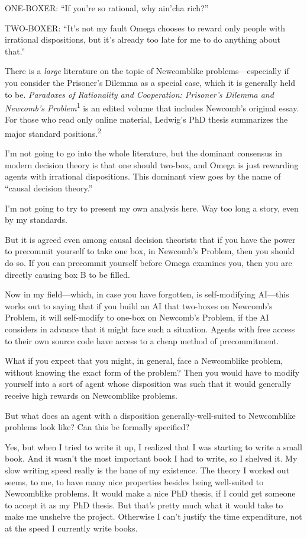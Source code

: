 {
 ONE-BOXER: ``If you're so
rational, why ain'cha rich?''}

{
 TWO-BOXER: ``It's not my fault
Omega chooses to reward only people with irrational dispositions, but
it's already too late for me to do anything about
that.''}

{
 There is a \textit{large} literature on the topic of Newcomblike
problems---especially if you consider the Prisoner's
Dilemma as a special case, which it is generally held to be.
\textit{Paradoxes of Rationality and Cooperation:
Prisoner's Dilemma and Newcomb's
Problem}\textsuperscript{1} is an edited volume that includes
Newcomb's original essay. For those who read only
online material, Ledwig's PhD thesis summarizes the
major standard positions.\textsuperscript{2}}

{
 I'm not going to go into the whole literature, but
the dominant consensus in modern decision theory is that one should
two-box, and Omega is just rewarding agents with irrational
dispositions. This dominant view goes by the name of
``causal decision theory.''}

{
 I'm not going to try to present my own analysis
here. Way too long a story, even by my standards.}

{
 But it is agreed even among causal decision theorists that if you
have the power to precommit yourself to take one box, in
Newcomb's Problem, then you should do so. If you can
precommit yourself before Omega examines you, then you are directly
causing box B to be filled.}

{
 Now in my field---which, in case you have forgotten, is
self-modifying AI---this works out to saying that if you build an AI
that two-boxes on Newcomb's Problem, it will
self-modify to one-box on Newcomb's Problem, if the AI
considers in advance that it might face such a situation. Agents with
free access to their own source code have access to a cheap method of
precommitment.}

{
 What if you expect that you might, in general, face a Newcomblike
problem, without knowing the exact form of the problem? Then you would
have to modify yourself into a sort of agent whose disposition was such
that it would generally receive high rewards on Newcomblike problems.}

{
 But what does an agent with a disposition generally-well-suited to
Newcomblike problems look like? Can this be formally specified?}

{
 Yes, but when I tried to write it up, I realized that I was
starting to write a small book. And it wasn't the most
important book I had to write, so I shelved it. My slow writing speed
really is the bane of my existence. The theory I worked out seems, to
me, to have many nice properties besides being well-suited to
Newcomblike problems. It would make a nice PhD thesis, if I could get
someone to accept it as my PhD thesis. But that's
pretty much what it would take to make me unshelve the project.
Otherwise I can't justify the time expenditure, not at
the speed I currently write books.}

